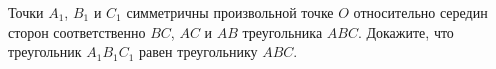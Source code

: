 \begin{ex}
	\begin{condition}
		Точки \( A_1 \), \( B_1  \) и \( C_1  \) симметричны произвольной точке \( O  \) относительно середин сторон соответственно \( BC \), \( AC  \) и \( AB \) треугольника \( ABC \). Докажите, что треугольник \( A_1B_1C_1 \) равен треугольнику \( ABC \).
	\end{condition}
\end{ex}